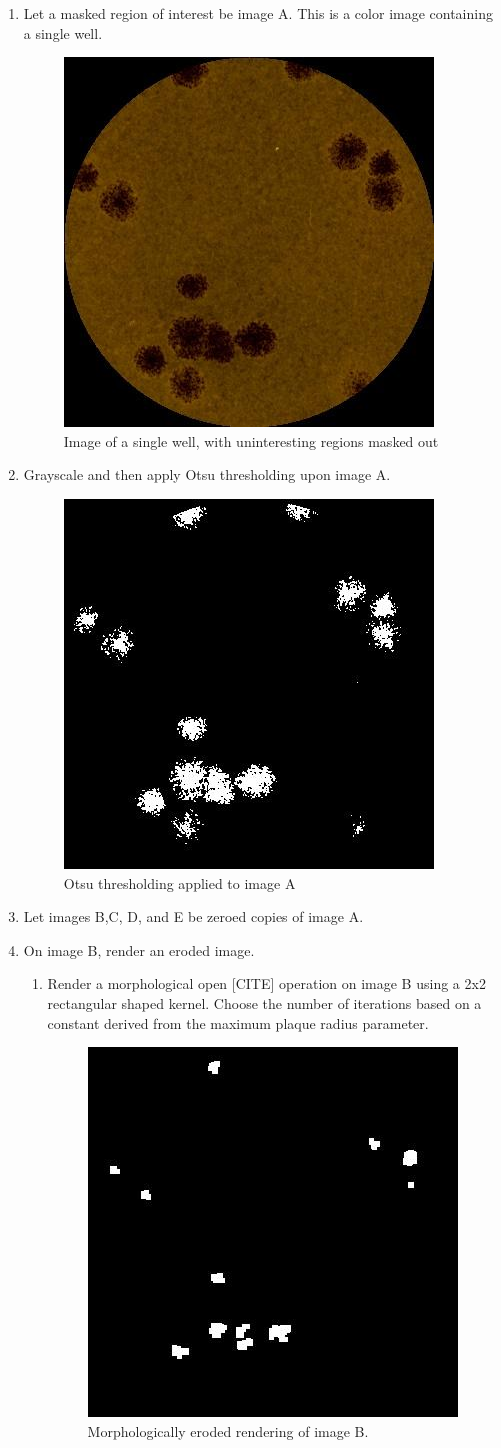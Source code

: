 \documentclass[11pt,final,twocolumn]{IEEEtran}
\begin{document}
\begin{enumerate}
\item Let a masked region of interest be image A. This is a color image containing a single well.
\begin{figure}[H]
\centering
\includegraphics[width=.25\textwidth]{countBegin.jpg}
\caption{Image of a single well, with uninteresting regions masked out}
\label{fig:countBegin}
\end{figure}


\item Grayscale and then apply Otsu thresholding upon image A.
\begin{figure}[H]
\centering
\includegraphics[width=.25\textwidth]{countOtsuA.jpg}
\caption{Otsu thresholding applied to image A}
\label{fig:countOtsuA}
\end{figure}

\item Let images B,C, D, and E be zeroed copies of image A.
\item On image B, render an eroded image.
\begin{enumerate}
\item
Render a morphological open [CITE] operation on image B using a 2x2  rectangular shaped kernel. Choose the number of iterations based on a constant derived from the maximum plaque radius parameter.
\begin{figure}[H]
\centering
\includegraphics[width=.25\textwidth]{countErodeB.jpg}
\caption{Morphologically eroded rendering of image B.}
\label{fig:countErodeB}
\end{figure}
\end{enumerate}


\end{enumerate}
\end{document}
